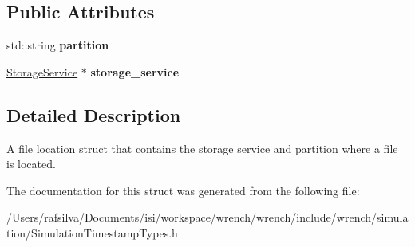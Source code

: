 \subsection*{Public Attributes}
\begin{DoxyCompactItemize}
\item 
\mbox{\label{structwrench_1_1_simulation_timestamp_file_copy_1_1_file_location_abbfd743a39bc124ef6dab2ca053a4989}} 
std\+::string {\bfseries partition}
\item 
\mbox{\label{structwrench_1_1_simulation_timestamp_file_copy_1_1_file_location_aee633ee71f58b8a4474ea9ad5db1e1fd}} 
\hyperlink{classwrench_1_1_storage_service}{Storage\+Service} $\ast$ {\bfseries storage\+\_\+service}
\end{DoxyCompactItemize}


\subsection{Detailed Description}
A file location struct that contains the storage service and partition where a file is located. 

The documentation for this struct was generated from the following file\+:\begin{DoxyCompactItemize}
\item 
/\+Users/rafsilva/\+Documents/isi/workspace/wrench/wrench/include/wrench/simulation/Simulation\+Timestamp\+Types.\+h\end{DoxyCompactItemize}
